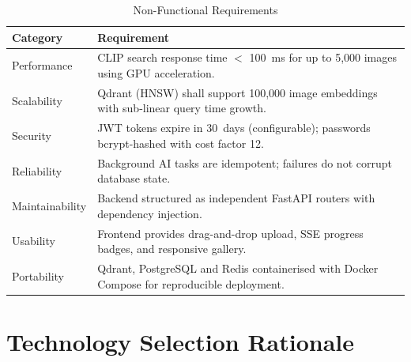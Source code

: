 \documentclass[12pt,a4paper,oneside]{report}
\begin{document}
\begin{table}[H]
\centering\small
\caption{Non-Functional Requirements}
\label{tab:nfr}
\renewcommand{\arraystretch}{1.4}
\begin{tabular}{|p{2.8cm}|p{10.5cm}|}
\hline
\textbf{Category} & \textbf{Requirement} \\
\hline
Performance & CLIP search response time $<$ 100~ms for up to 5{,}000 images using GPU acceleration. \\
\hline
Scalability & Qdrant (HNSW) shall support 100{,}000 image embeddings with sub-linear query time growth. \\
\hline
Security & JWT tokens expire in 30~days (configurable); passwords bcrypt-hashed with cost factor 12. \\
\hline
Reliability & Background AI tasks are idempotent; failures do not corrupt database state. \\
\hline
Maintainability & Backend structured as independent FastAPI routers with dependency injection. \\
\hline
Usability & Frontend provides drag-and-drop upload, SSE progress badges, and responsive gallery. \\
\hline
Portability & Qdrant, PostgreSQL and Redis containerised with Docker Compose for reproducible deployment. \\
\hline
\end{tabular}
\end{table}

\section{Technology Selection Rationale}
\label{sec:tech-rationale}
\end{document}
